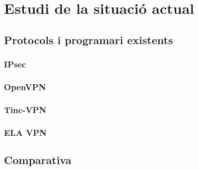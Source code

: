 \chapter{Estudi de la situació actual}
\section{Protocols i programari existents}
\subsection{IPsec}
\subsection{OpenVPN}
\subsection{Tinc-VPN}
\subsection{ELA VPN}
\section{Comparativa}
